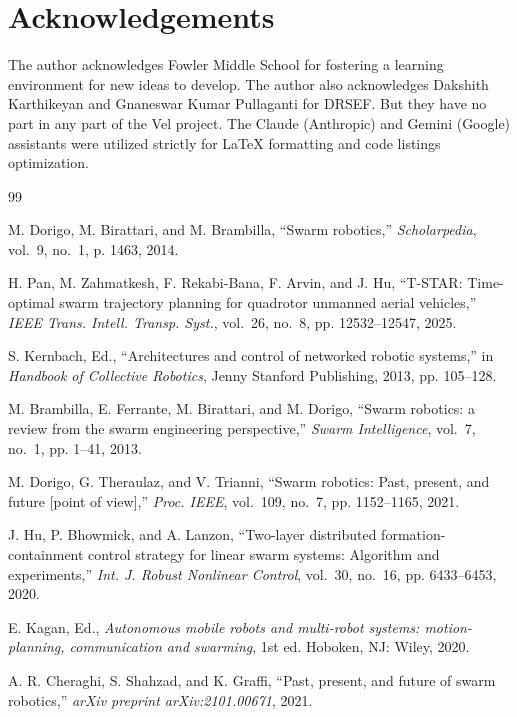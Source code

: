 \documentclass[journal,twoside]{IEEEtran}
\begin{document}
\section*{Acknowledgements}
The author acknowledges Fowler Middle School for fostering a learning environment for new ideas to develop. The author also acknowledges Dakshith Karthikeyan and Gnaneswar Kumar Pullaganti for DRSEF. But they have no part in any part of the Vel project. The Claude (Anthropic) and Gemini (Google) assistants were utilized strictly for LaTeX formatting and code listings optimization.

\begin{thebibliography}{99}

M. Dorigo, M. Birattari, and M. Brambilla, ``Swarm robotics,'' \emph{Scholarpedia}, vol.~9, no.~1, p. 1463, 2014.

H. Pan, M. Zahmatkesh, F. Rekabi-Bana, F. Arvin, and J. Hu, ``T-STAR: Time-optimal swarm trajectory planning for quadrotor unmanned aerial vehicles,'' \emph{IEEE Trans. Intell. Transp. Syst.}, vol.~26, no.~8, pp. 12532--12547, 2025.

S. Kernbach, Ed., ``Architectures and control of networked robotic systems,'' in \emph{Handbook of Collective Robotics}, Jenny Stanford Publishing, 2013, pp. 105--128.

M. Brambilla, E. Ferrante, M. Birattari, and M. Dorigo, ``Swarm robotics: a review from the swarm engineering perspective,'' \emph{Swarm Intelligence}, vol.~7, no.~1, pp. 1--41, 2013.

M. Dorigo, G. Theraulaz, and V. Trianni, ``Swarm robotics: Past, present, and future [point of view],'' \emph{Proc. IEEE}, vol.~109, no.~7, pp. 1152--1165, 2021.

J. Hu, P. Bhowmick, and A. Lanzon, ``Two-layer distributed formation-containment control strategy for linear swarm systems: Algorithm and experiments,'' \emph{Int. J. Robust Nonlinear Control}, vol.~30, no.~16, pp. 6433--6453, 2020.

E. Kagan, Ed., \emph{Autonomous mobile robots and multi-robot systems: motion-planning, communication and swarming}, 1st ed. Hoboken, NJ: Wiley, 2020.

A. R. Cheraghi, S. Shahzad, and K. Graffi, ``Past, present, and future of swarm robotics,'' \emph{arXiv preprint arXiv:2101.00671}, 2021.


\end{thebibliography}
\end{document}
